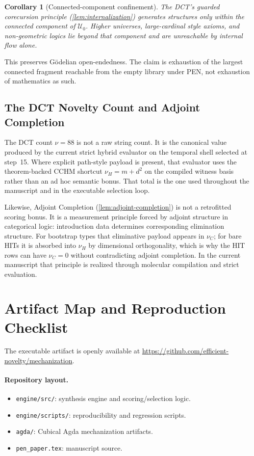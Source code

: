 \documentclass[11pt,a4paper]{article}
\theoremstyle{plain}
\newtheorem{corollary}[theorem]{Corollary}
\theoremstyle{definition}
\theoremstyle{remark}
\newcommand{\U}{\mathcal{U}}
\begin{document}
\begin{corollary}[Connected-component confinement]
\label{cor:confinement}
The DCT's guarded corecursion principle (\cref{lem:internalization}) generates structures only within the connected component of $\U_0$.
Higher universes, large-cardinal style axioms, and non-geometric logics lie beyond that component and are unreachable by internal flow alone.
\end{corollary}

This preserves G\"odelian open-endedness.
The claim is exhaustion of the largest connected fragment reachable from the empty library under PEN, not exhaustion of mathematics as such.

\subsection{The DCT Novelty Count and Adjoint Completion}
\label{sec:adjoint-completion}

The DCT count $\nu=88$ is not a raw string count.
It is the canonical value produced by the current strict hybrid evaluator on the temporal shell selected at step~15.
Where explicit path-style payload is present, that evaluator uses the theorem-backed CCHM shortcut $\nu_H=m+d^2$ on the compiled witness basis rather than an ad hoc semantic bonus.
That total is the one used throughout the manuscript and in the executable selection loop.

Likewise, Adjoint Completion (\cref{lem:adjoint-completion}) is not a retrofitted scoring bonus.
It is a measurement principle forced by adjoint structure in categorical logic: introduction data determines corresponding elimination structure.
For bootstrap types that eliminative payload appears in $\nu_C$; for bare HITs it is absorbed into $\nu_H$ by dimensional orthogonality, which is why the HIT rows can have $\nu_C=0$ without contradicting adjoint completion.
In the current manuscript that principle is realized through molecular compilation and strict evaluation.

\section{Artifact Map and Reproduction Checklist}
\label{app:artifact-map}

The executable artifact is openly available at \url{https://github.com/efficient-novelty/mechanization}.

\paragraph{Repository layout.}
\begin{itemize}[nosep]
    \item \texttt{engine/src/}: synthesis engine and scoring/selection logic.
    \item \texttt{engine/scripts/}: reproducibility and regression scripts.
    \item \texttt{agda/}: Cubical Agda mechanization artifacts.
    \item \texttt{pen\_paper.tex}: manuscript source.
\end{itemize}
\end{document}
